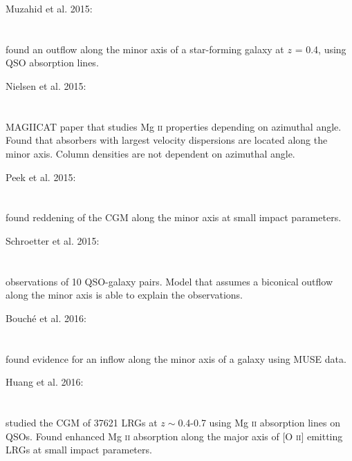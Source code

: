 \hline

Muzahid et al. 2015: \\
\citet{2015ApJ...811..132M} \\
\citep{2015ApJ...811..132M} \\
found an outflow along the minor axis of a star-forming galaxy at $z$ = 0.4,
using QSO absorption lines. \\

\hline

Nielsen et al. 2015: \\
\citet{2015ApJ...812...83N} \\
\citep{2015ApJ...812...83N} \\
MAGIICAT paper that studies Mg \textsc{ii} properties depending on azimuthal
angle. Found that absorbers with largest velocity dispersions are located along
the minor axis. Column densities are not dependent on azimuthal angle. \\

\hline

Peek et al. 2015: \\
\citet{2015ApJ...813....7P} \\
\citep{2015ApJ...813....7P} \\
found reddening of the CGM along the minor axis at small impact parameters. \\

\hline

Schroetter et al. 2015: \\
\citet{2015ApJ...804...83S} \\
\citep{2015ApJ...804...83S} \\
observations of 10 QSO-galaxy pairs. Model that assumes a biconical outflow
along the minor axis is able to explain the observations. \\

\hline

Bouché et al. 2016: \\
\citet{2016ApJ...820..121B} \\
\citep{2016ApJ...820..121B} \\
found evidence for an inflow along the minor axis of a galaxy using MUSE
data. \\

\hline

Huang et al. 2016: \\
\citet{2016MNRAS.455.1713H} \\
\citep{2016MNRAS.455.1713H} \\
studied the CGM of 37621 LRGs at $z\sim$0.4-0.7 using Mg \textsc{ii} absorption
lines on QSOs. Found enhanced Mg \textsc{ii} absorption along the major axis of
[O \textsc{ii}] emitting LRGs at small impact parameters. \\


